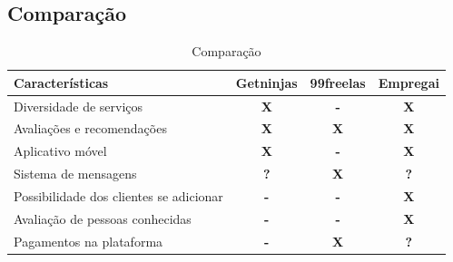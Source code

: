 \subsection{Comparação}
\begin{table}[htb]
    \centering
    \caption{Comparação}
    \label{tab:comparação}
\begin{tabular}{|p{5cm}|p{2cm}|p{2cm}|p{2cm}|}
    \hline
    \textbf{Características} & \textbf{Getninjas} & \textbf{99freelas} & \textbf{Empregai}  \\ \hline
    Diversidade de serviços   & \multicolumn{1}{c|}{\textbf{X}}   & \multicolumn{1}{c|}{\textbf{-}}  & \multicolumn{1}{c|}{\textbf{X}} \\ \hline
	Avaliações e recomendações   & \multicolumn{1}{c|}{\textbf{X}}   & \multicolumn{1}{c|}{\textbf{X}}  & \multicolumn{1}{c|}{\textbf{X}} \\ \hline
    Aplicativo móvel   & \multicolumn{1}{c|}{\textbf{X}}   & \multicolumn{1}{c|}{\textbf{-}}  & \multicolumn{1}{c|}{\textbf{X}} \\ \hline
    Sistema de mensagens   & \multicolumn{1}{c|}{\textbf{?}}   & \multicolumn{1}{c|}{\textbf{X}}  & \multicolumn{1}{c|}{\textbf{?}} \\ \hline
    Possibilidade dos clientes se adicionar   & \multicolumn{1}{c|}{\textbf{-}}   & \multicolumn{1}{c|}{\textbf{-}}  & \multicolumn{1}{c|}{\textbf{X}} \\ \hline
	Avaliação de pessoas conhecidas   & \multicolumn{1}{c|}{\textbf{-}}   & \multicolumn{1}{c|}{\textbf{-}}  & \multicolumn{1}{c|}{\textbf{X}} \\ \hline
	Pagamentos na plataforma   & \multicolumn{1}{c|}{\textbf{-}}   & \multicolumn{1}{c|}{\textbf{X}}  & \multicolumn{1}{c|}{\textbf{?}} \\ \hline
\end{tabular}
\end{table}